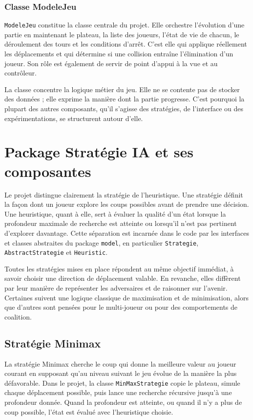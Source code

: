 \documentclass[11pt,a4paper]{article}
\begin{document}
\subsubsection{Classe ModeleJeu}

\texttt{ModeleJeu} constitue la classe centrale du projet. Elle orchestre l'évolution d'une partie en maintenant le plateau, la liste des joueurs, l'état de vie de chacun, le déroulement des tours et les conditions d'arrêt. C'est elle qui applique réellement les déplacements et qui détermine si une collision entraîne l'élimination d'un joueur. Son rôle est également de servir de point d'appui à la vue et au contrôleur.

La classe concentre la logique métier du jeu. Elle ne se contente pas de stocker des données ; elle exprime la manière dont la partie progresse. C'est pourquoi la plupart des autres composants, qu'il s'agisse des stratégies, de l'interface ou des expérimentations, se structurent autour d'elle.

\section{Package Stratégie IA et ses composantes}

Le projet distingue clairement la stratégie de l'heuristique. Une stratégie définit la façon dont un joueur explore les coups possibles avant de prendre une décision. Une heuristique, quant à elle, sert à évaluer la qualité d'un état lorsque la profondeur maximale de recherche est atteinte ou lorsqu'il n'est pas pertinent d'explorer davantage. Cette séparation est incarnée dans le code par les interfaces et classes abstraites du package \texttt{model}, en particulier \texttt{Strategie}, \texttt{AbstractStrategie} et \texttt{Heuristic}.

Toutes les stratégies mises en place répondent au même objectif immédiat, à savoir choisir une direction de déplacement valable. En revanche, elles diffèrent par leur manière de représenter les adversaires et de raisonner sur l'avenir. Certaines suivent une logique classique de maximisation et de minimisation, alors que d'autres sont pensées pour le multi-joueur ou pour des comportements de coalition.

\subsection{Stratégie Minimax}

La stratégie Minimax cherche le coup qui donne la meilleure valeur au joueur courant en supposant qu'au niveau suivant le jeu évolue de la manière la plus défavorable. Dans le projet, la classe \texttt{MinMaxStrategie} copie le plateau, simule chaque déplacement possible, puis lance une recherche récursive jusqu'à une profondeur donnée. Quand la profondeur est atteinte, ou quand il n'y a plus de coup possible, l'état est évalué avec l'heuristique choisie.
\end{document}
